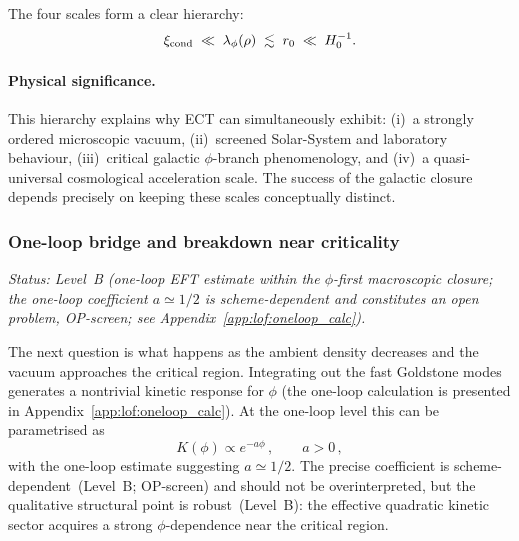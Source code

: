 \documentclass[11pt,a4paper]{article}
\numberwithin{equation}{section}
\begin{document}
The four scales form a clear hierarchy:
\begin{equation}
\label{eq:scale_hierarchy}
\xi_{\rm cond}
\;\ll\;
\lambda_\phi(\rho)
\;\lesssim\;
r_0
\;\ll\;
H_0^{-1}.
\end{equation}

\paragraph{Physical significance.}
This hierarchy explains why ECT can simultaneously exhibit:
(i)~a strongly ordered microscopic vacuum,
(ii)~screened Solar-System and laboratory behaviour,
(iii)~critical galactic $\phi$-branch phenomenology, and
(iv)~a quasi-universal cosmological acceleration scale.
The success of the galactic closure depends precisely on keeping
these scales conceptually distinct.

\subsubsection*{One-loop bridge and breakdown near criticality}
\label{subsec:lof_oneloop}

\textit{Status: Level~B (one-loop EFT estimate within the
$\phi$-first macroscopic closure; the one-loop coefficient
$a\simeq 1/2$ is scheme-dependent and constitutes an open
problem, OP-screen; see Appendix~\ref{app:lof:oneloop_calc}).}

The next question is what happens as the ambient density decreases
and the vacuum approaches the critical region. Integrating out the
fast Goldstone modes generates a nontrivial kinetic response for
$\phi$ (the one-loop calculation is presented in
Appendix~\ref{app:lof:oneloop_calc}). At the one-loop level this
can be parametrised as
\begin{equation}
K(\phi) \propto e^{-a\phi}\,,
\qquad a > 0\,,
\label{eq:kphi_main}
\end{equation}
with the one-loop estimate suggesting $a \simeq 1/2$. The precise coefficient is scheme-dependent~(Level~B; OP-screen) and
should not be overinterpreted,
but the qualitative structural point is robust~(Level~B): the effective quadratic kinetic
sector acquires a strong $\phi$-dependence near the critical region.
\end{document}
